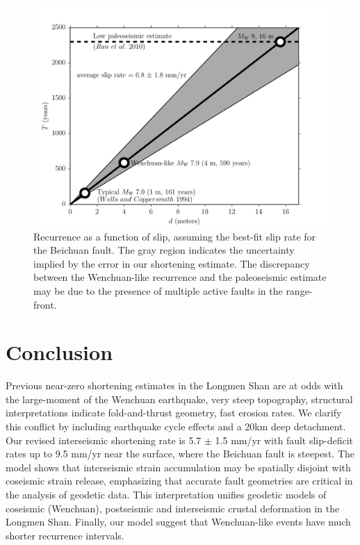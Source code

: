 \documentclass[12pt]{article}
\begin{document}
\begin{figure}[h!]
    \centering
    \includegraphics{figs/hazard_all_details.pdf}
    \caption{Recurrence as a function of slip, assuming the best-fit slip rate for the Beichuan fault. The gray region indicates the uncertainty implied by the error in our shortening estimate. The discrepancy between the Wenchuan-like recurrence and the paleoseismic estimate may be due to the presence of multiple active faults in the range-front.}
    \label{fig:hazard}
\end{figure}

\section{Conclusion}
Previous near-zero shortening estimates in the Longmen Shan are at odds with the large-moment of the Wenchuan earthquake, very steep topography, structural interpretations indicate fold-and-thrust geometry, fast erosion rates. We clarify this conflict by including earthquake cycle effects and a 20km deep detachment. Our revised interseismic shortening rate is 5.7 $\pm$ 1.5 mm/yr with fault slip-deficit rates up to 9.5 mm/yr near the surface, where the Beichuan fault is steepest. The model shows that interseismic strain accumulation may be spatially disjoint with coseismic strain release, emphasizing that accurate fault geometries are critical in the analysis of geodetic data. This interpretation unifies geodetic models of coseismic (Wenchuan), postseismic and interseismic crustal deformation in the Longmen Shan. Finally, our model suggest that Wenchuan-like events have much shorter recurrence intervals.



\end{document}
